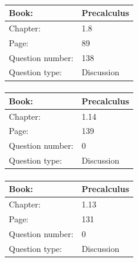 \documentclass{article}
\begin{document}
            \paragraph{}
            \begin{tabularx}{1\textwidth}{
                    p{}
                    p{}
                }
                \toprule
                Book: & Precalculus
                \\
                \midrule
                Chapter: & 1.8
                \\
                \midrule
                Page: & 89
                \\
                \midrule
                Question number: & 138
                \\
                \midrule
                Question type: & Discussion
                \\
                \bottomrule
            \end{tabularx}
            
            \paragraph{}
            \begin{tabularx}{1\textwidth}{
                    p{}
                    p{}
                }
                \toprule
                Book: & Precalculus
                \\
                \midrule
                Chapter: & 1.14
                \\
                \midrule
                Page: & 139
                \\
                \midrule
                Question number: & 0
                \\
                \midrule
                Question type: & Discussion
                \\
                \bottomrule
            \end{tabularx}
            
            \paragraph{}
            \begin{tabularx}{1\textwidth}{
                    p{}
                    p{}
                }
                \toprule
                Book: & Precalculus
                \\
                \midrule
                Chapter: & 1.13
                \\
                \midrule
                Page: & 131
                \\
                \midrule
                Question number: & 0
                \\
                \midrule
                Question type: & Discussion
                \\
                \bottomrule
            \end{tabularx}
            
\end{document}
